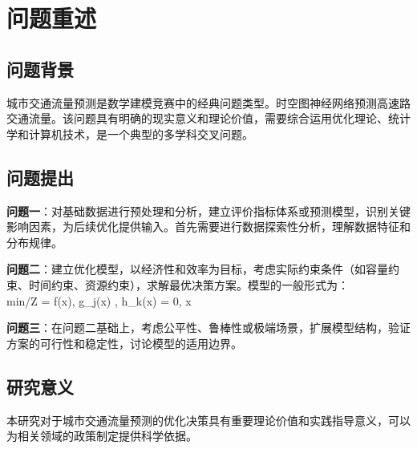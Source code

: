 \newpage
\section{问题重述}

\subsection{问题背景}
城市交通流量预测是数学建模竞赛中的经典问题类型。时空图神经网络预测高速路交通流量。该问题具有明确的现实意义和理论价值，需要综合运用优化理论、统计学和计算机技术，是一个典型的多学科交叉问题。

\subsection{问题提出}
\textbf{问题一}：对基础数据进行预处理和分析，建立评价指标体系或预测模型，识别关键影响因素，为后续优化提供输入。首先需要进行数据探索性分析，理解数据特征和分布规律。

\textbf{问题二}：建立优化模型，以经济性和效率为目标，考虑实际约束条件（如容量约束、时间约束、资源约束），求解最优决策方案。模型的一般形式为：
\\min/\max \quad Z = f(x), \quad {} \quad g_j(x) , \; h_k(x) = 0, \; x \in {}

\textbf{问题三}：在问题二基础上，考虑公平性、鲁棒性或极端场景，扩展模型结构，验证方案的可行性和稳定性，讨论模型的适用边界。

\subsection{研究意义}
本研究对于城市交通流量预测的优化决策具有重要理论价值和实践指导意义，可以为相关领域的政策制定提供科学依据。
